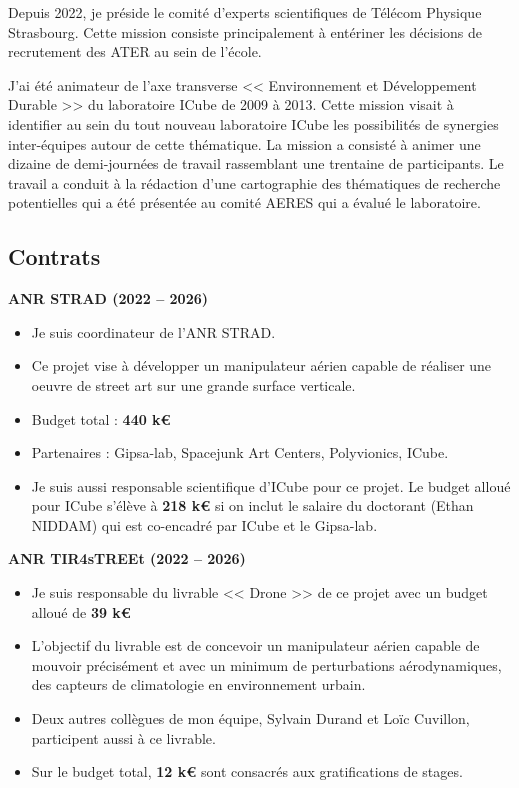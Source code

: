 \documentclass[a4paper,12pt]{article}
\begin{document}
Depuis 2022, je préside le comité d’experts scientifiques de Télécom Physique Strasbourg. Cette mission consiste principalement à entériner les décisions de recrutement des ATER au sein de l’école.

J'ai été animateur de l'axe transverse << Environnement et Développement Durable >> du laboratoire ICube de 2009 à 2013. Cette mission visait à identifier au sein du tout nouveau laboratoire ICube les possibilités de synergies inter-équipes autour de cette thématique. La mission a consisté à animer une dizaine de demi-journées de travail rassemblant une trentaine de participants. Le travail a conduit à la rédaction d'une cartographie des thématiques de recherche potentielles qui a été présentée au comité AERES qui a évalué le laboratoire.

\subsection{Contrats}

\textbf{ANR STRAD (2022 -- 2026)}

\begin{itemize}
    \item Je suis coordinateur de l’ANR STRAD.
    \item Ce projet vise à développer un manipulateur aérien capable de réaliser une oeuvre de street art sur une grande surface verticale.
    \item Budget total : \textbf{440 k€}
    \item Partenaires : Gipsa-lab, Spacejunk Art Centers, Polyvionics, ICube.
    \item Je suis aussi responsable scientifique d'ICube pour ce projet. Le budget alloué pour ICube s'élève à \textbf{218 k€} si on inclut le salaire du doctorant (Ethan NIDDAM) qui est co-encadré par ICube et le Gipsa-lab.
\end{itemize}

\textbf{ANR TIR4sTREEt (2022 -- 2026)}

\begin{itemize}
    \item Je suis responsable du livrable << Drone >> de ce projet avec un budget alloué de \textbf{39 k€}
    \item L’objectif du livrable est de concevoir un manipulateur aérien capable de mouvoir précisément et avec un minimum de perturbations aérodynamiques, des capteurs de climatologie en environnement urbain. 
    \item Deux autres collègues de mon équipe, Sylvain Durand et Loïc Cuvillon, participent aussi à ce livrable. 
    \item Sur le budget total, \textbf{12 k€} sont consacrés aux gratifications de stages.
\end{itemize}
\end{document}

